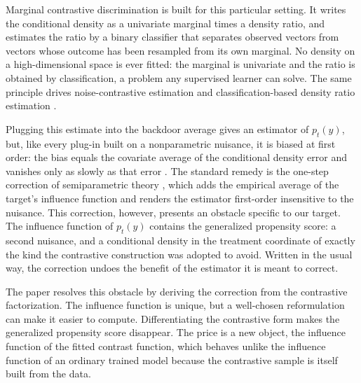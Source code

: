 \documentclass[11pt]{article}
\theoremstyle{plain}
\theoremstyle{definition}
\theoremstyle{remark}
\begin{document}
Marginal contrastive discrimination \citep{meziani2025mcd} is built for this particular setting.
It writes the conditional density as a univariate marginal times a density ratio, and
estimates the ratio by a binary classifier that separates observed vectors from vectors
whose outcome has been resampled from its own marginal. No density on a high-dimensional
space is ever fitted: the marginal is univariate and the ratio is obtained by
classification, a problem any supervised learner can solve. The same principle drives
noise-contrastive estimation \citep{gutmann2010nce} and classification-based density ratio
estimation \citep{sugiyama2012density}.

Plugging this estimate into the backdoor average gives an estimator of $p_t(y)$, but,
like every plug-in built on a nonparametric nuisance, it is biased at first order: the
bias equals the covariate average of the conditional density error and vanishes only as
slowly as that error \citep{bickel1988,robins2008}. The standard remedy is the one-step
correction of semiparametric theory
\citep{vanderlaan2006tmle,chernozhukov2018,kennedy2022review}, which adds the empirical
average of the target's influence function and renders the estimator first-order
insensitive to the nuisance. This correction, however, presents an obstacle specific to
our target. The influence function of $p_t(y)$ contains the generalized propensity score:
a second nuisance, and a conditional density in the treatment coordinate of exactly the
kind the contrastive construction was adopted to avoid. Written in the usual way, the
correction undoes the benefit of the estimator it is meant to correct.

The paper resolves this obstacle by deriving the correction from the contrastive factorization. The influence function is unique, but a well-chosen reformulation can make it easier to compute. Differentiating the contrastive form makes the generalized propensity score disappear. The price is a new object, the influence function of the fitted contrast function, which behaves unlike the influence function of an ordinary trained model because the contrastive sample is itself built from the data.
\end{document}
